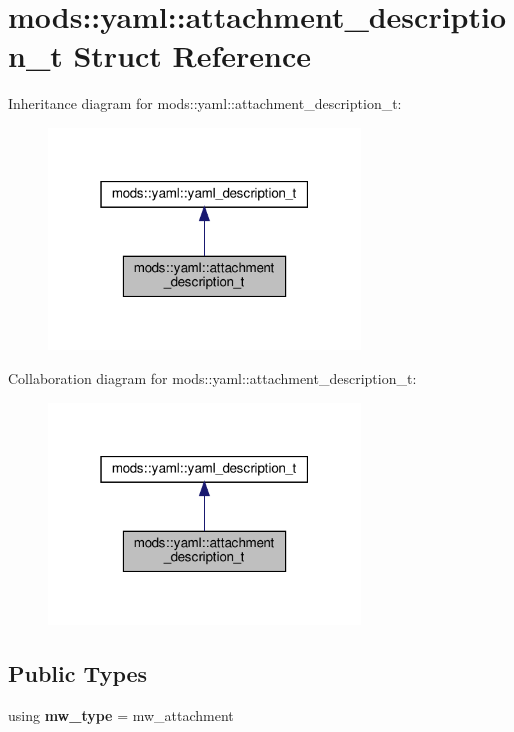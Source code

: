 \hypertarget{structmods_1_1yaml_1_1attachment__description__t}{}\section{mods\+:\+:yaml\+:\+:attachment\+\_\+description\+\_\+t Struct Reference}
\label{structmods_1_1yaml_1_1attachment__description__t}


Inheritance diagram for mods\+:\+:yaml\+:\+:attachment\+\_\+description\+\_\+t\+:
\nopagebreak
\begin{figure}[H]
\begin{center}
\leavevmode
\includegraphics[width=235pt]{structmods_1_1yaml_1_1attachment__description__t__inherit__graph}
\end{center}
\end{figure}


Collaboration diagram for mods\+:\+:yaml\+:\+:attachment\+\_\+description\+\_\+t\+:
\nopagebreak
\begin{figure}[H]
\begin{center}
\leavevmode
\includegraphics[width=235pt]{structmods_1_1yaml_1_1attachment__description__t__coll__graph}
\end{center}
\end{figure}
\subsection*{Public Types}
\begin{DoxyCompactItemize}
\item 
\mbox{\label{structmods_1_1yaml_1_1attachment__description__t_ac1d79e8edb937c62acc8f148f495d77b}} 
using {\bfseries mw\+\_\+type} = mw\+\_\+attachment
\end{DoxyCompactItemize}
